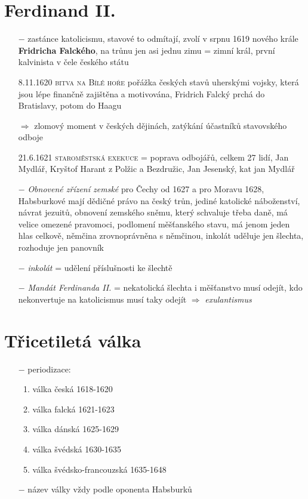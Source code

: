 \documentclass{article}
\begin{document}
\section*{Ferdinand II.}
\begin{itemize}
    \vspace{-0.5em}
    \setlength\itemsep{0.15em}
    \item[$-$] zastánce katolicismu, stavové to odmítají, zvolí v srpnu 1619 nového krále \textbf{Fridricha Falckého}, na trůnu jen asi jednu zimu = zimní král, první kalvinista v čele českého státu
    \item[8.11.1620] \textsc{bitva na Bílé hoře} pořážka českých stavů uherskými vojsky, která jsou lépe finančně zajištěna a motivována, Fridrich Falcký prchá do Bratislavy, potom do Haagu
    \item[$\Rightarrow$ ] zlomový moment v českých dějinách, zatýkání účastníků stavovského odboje
    \item[21.6.1621] \textsc{staroměstská exekuce} = poprava odbojářů, celkem 27 lidí, Jan Mydlář, Kryštof Harant z Polžic a Bezdružic,  Jan Jesenský, kat jan Mydlář
    \item[$-$] \textit{Obnovené zřízení zemské} pro Čechy od 1627 a pro Moravu 1628, Habsburkové mají dědičné právo na český trůn, jediné katolické náboženství, návrat jezuitů, obnovení zemského sněmu, který schvaluje třeba daně, má velice omezené pravomoci, podlomení měšťanského stavu, má jenom jeden hlas celkově, němčina zrovnoprávněna s němčinou, inkolát uděluje jen šlechta, rozhoduje jen panovník
    \item[$-$] \textit{inkolát} = udělení příslušnosti ke šlechtě
    \item[$-$] \textit{Mandát Ferdinanda II.} = nekatolická šlechta i měšťanstvo musí odejít, kdo nekonvertuje na katolicismus musí taky odejít $\Rightarrow$ \textit{exulantismus}

\end{itemize}

\section*{Třicetiletá válka}
\begin{itemize}
    \vspace{-0.5em}
    \setlength\itemsep{0.15em}
    \item[$-$] periodizace:
    \begin{enumerate}
        \vspace{-0.5em}
        \setlength\itemsep{0.15em}
        \item válka česká 1618-1620
        \item válka falcká 1621-1623
        \item válka dánská 1625-1629
        \item válka švédská 1630-1635
        \item válka švédsko-francouzská 1635-1648
    \end{enumerate}
    \item[$-$] název války vždy podle oponenta Habsburků

\end{itemize}
\end{document}
